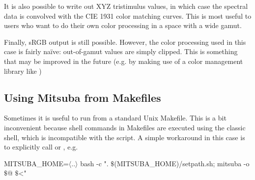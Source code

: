 It is also possible to write out XYZ tristimulus values, in which case the spectral
data is convolved with the CIE 1931 color matching curves. This is most useful to users
who want to do their own color processing in a space with a wide gamut.

Finally, sRGB output is still possible. However, the color processing used in this case
is fairly na\"ive: out-of-gamut values are simply clipped. This is something that may
be improved in the future (e.g. by making use of a color management library like )

\subsection{Using Mitsuba from Makefiles}
Sometimes it is useful to run  from a standard Unix Makefile. This is a bit inconvenient because  shell commands in Makefiles are executed using the
classic  shell, which is incompatible with the  script.
A simple workaround in this case is to explicitly call  or , e.g.
\begin{shell}
MITSUBA_HOME=$\langle$..$\rangle$
    bash -c ". $\texttt{\$}$(MITSUBA_HOME)/setpath.sh; mitsuba -o $\texttt{\$}$@ $\texttt{\$}$<"
\end{shell}

